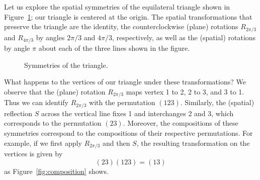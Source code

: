 



\begin{example}
Let us explore the spatial symmetries of the equilateral triangle shown in Figure~\ref{fig:triangle}; our triangle is centered at the origin. The spatial transformations that preserve the triangle are the identity, the counterclockwise (plane) rotations  $R_{2\pi/3}$  and  $R_{4\pi/3}$ by angles $2\pi/3$ and  $4\pi/3$, respectively, as well as the (spatial) rotations by angle  $\pi$  about each of the three lines shown in the figure.
\begin{figure}[h]
\caption{Symmetries of the triangle.}
\label{fig:triangle}
\end{figure}

What happens to the vertices of our triangle under these transformations? We observe that the (plane) rotation  $R_{2\pi/3}$  maps vertex  1  to  2,  2  to  3, and  3  to  1. Thus we can identify $R_{2\pi/3}$ with the permutation  $(123)$. Similarly, the (spatial) reflection  $S$  across the vertical line fixes  1  and interchanges  2  and  3, which corresponds to the permutation $(23)$.
Moreover, the compositions of these symmetries correspond to the compositions of their respective permutations. For example, if we first apply  $R_{2\pi/3}$  and then $S$, the resulting transformation on the vertices is given by
\[
(23)(123)=(13)
\]
as Figure~\ref{fig:composition} shows. 

\begin{figure}
\begin{tikzpicture}


\end{tikzpicture}
\end{figure}
\end{example}
